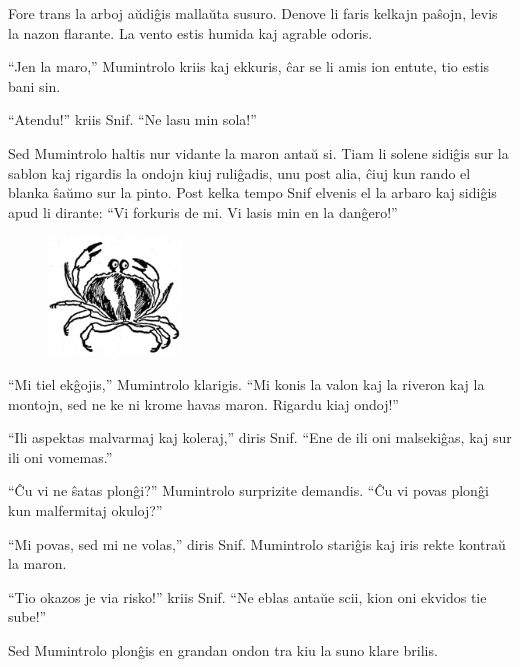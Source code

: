 Fore trans la arboj aŭdiĝis mallaŭta susuro. Denove li faris kelkajn paŝojn, levis la nazon flarante. La vento estis humida kaj agrable odoris.

``Jen la maro,'' Mumintrolo kriis kaj ekkuris, ĉar se li amis ion entute, tio estis bani sin.

``Atendu!'' kriis Snif. ``Ne lasu min sola!''

Sed Mumintrolo haltis nur vidante la maron antaŭ si. Tiam li solene sidiĝis sur la sablon kaj rigardis la ondojn kiuj ruliĝadis, unu post alia, ĉiuj kun rando el blanka ŝaŭmo sur la pinto. Post kelka tempo Snif elvenis el la arbaro kaj sidiĝis apud li dirante: ``Vi forkuris de mi. Vi lasis min en la danĝero!''

\begin{figure}[htbp]
\centering
\includegraphics[width=100pt,height=90pt]{1-4.png}
\caption{}
\label{1-4}
\end{figure}

``Mi tiel ekĝojis,'' Mumintrolo klarigis. ``Mi konis la valon kaj la riveron kaj la montojn, sed ne ke ni krome havas maron. Rigardu kiaj ondoj!''

``Ili aspektas malvarmaj kaj koleraj,'' diris Snif. ``Ene de ili oni malsekiĝas, kaj sur ili oni vomemas.''

``Ĉu vi ne ŝatas plonĝi?'' Mumintrolo surprizite demandis. ``Ĉu vi povas plonĝi kun malfermitaj okuloj?''

``Mi povas, sed mi ne volas,'' diris Snif. Mumintrolo stariĝis kaj iris rekte kontraŭ la maron.

``Tio okazos je via risko!'' kriis Snif. ``Ne eblas antaŭe scii, kion oni ekvidos tie sube!''

Sed Mumintrolo plonĝis en grandan ondon tra kiu la suno klare brilis.

